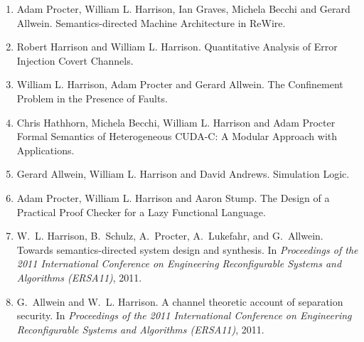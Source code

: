 \documentclass[12pt]{article} %
\begin{document}
\begin{enumerate}[leftmargin=0.0mm]
\item
Adam Procter, William L. Harrison, Ian Graves, Michela Becchi and Gerard Allwein.
\newblock Semantics-directed Machine Architecture in ReWire.

\item
Robert Harrison and William L. Harrison.
\newblock Quantitative Analysis of Error Injection Covert Channels.

\item
   William L. Harrison, Adam Procter and Gerard Allwein.
\newblock The Confinement Problem in the Presence of Faults.
                  

\item
Chris Hathhorn, Michela Becchi, William L. Harrison and Adam Procter
\newblock Formal Semantics of Heterogeneous CUDA-C: A Modular Approach with Applications.

\item
Gerard Allwein, William L. Harrison and David Andrews.
\newblock Simulation Logic.


\item
 Adam Procter, William L. Harrison and Aaron Stump.
 \newblock The Design of a Practical Proof Checker for a Lazy Functional Language.


\item
W.~L. Harrison, B.~Schulz, A.~Procter, A.~Lukefahr, and G.~Allwein.
\newblock Towards semantics-directed system design and synthesis.
\newblock In {\em Proceedings of the 2011 International Conference on
  Engineering Reconfigurable Systems and Algorithms (ERSA11)}, 2011.

\item
G.~Allwein and W.~L. Harrison.
\newblock A channel theoretic account of separation security.
\newblock In {\em Proceedings of the 2011 International Conference on
  Engineering Reconfigurable Systems and Algorithms (ERSA11)}, 2011.




\end{enumerate}
\end{document}
